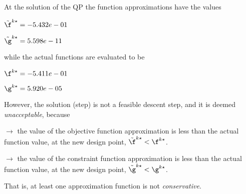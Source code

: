 At the solution of the QP the function approximations have the values

$\tilde \f^{k\star} = -5.432e-01$

$\tilde \g^{k\star} =  5.598e-11$

\bigskip
while the actual functions are evaluated to be

$\f^{k\star} = -5.411e-01$

$\g^{k\star} =  5.920e-05$

\bigskip
 However, the solution (step)                         is not a feasible descent step, and it is deemed                         \emph{unacceptable}, because 
 
$\to$ the value of the objective                             function approximation is less than the actual function                             value, at the new design point,                             $\tilde {\f}^{k\star} < {\f}^{k\star}$.

 $\to$ the value of the constraint function                             approximation is less than the actual function value, at                             the new design point, $\tilde {\g}^{k\star} < {\g}^{k\star}$.

 \bigskip 

 That is, at least one approximation                         function is not \emph{conservative}.
